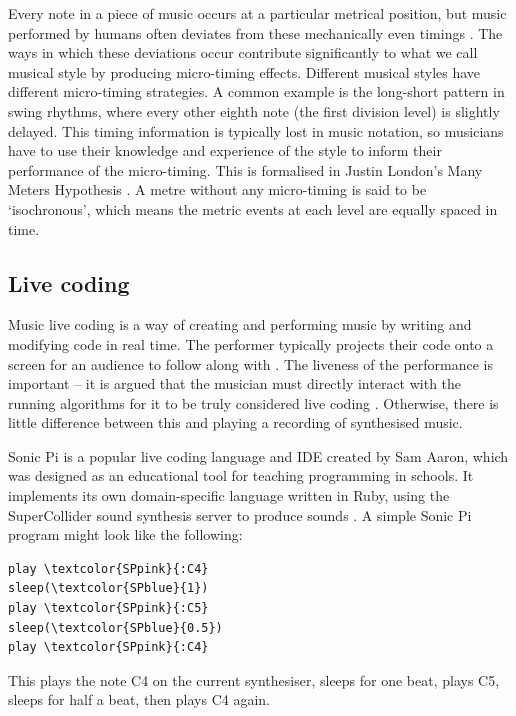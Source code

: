 \documentclass[12pt,twoside,openright]{report}
\begin{document}
Every note in a piece of music occurs at a particular metrical position, but
music performed by humans often deviates from these mechanically even timings
\cite{london2012}. The ways in which these deviations occur contribute significantly
to what we call musical style by producing micro-timing effects. Different
musical styles have different micro-timing strategies. A common example is the
long-short pattern in swing rhythms, where every other eighth note (the first
division level) is slightly delayed. This timing information is typically lost
in music notation, so musicians have to use
their knowledge and experience of the style to inform their performance of the
micro-timing. This is formalised in Justin London's Many Meters Hypothesis
\cite{london2012}. A metre without any micro-timing is said to be `isochronous',
which means the metric events at each level are equally spaced in time.


\subsection{Live coding} \label{live_coding_background}

Music live coding is a way of creating and performing music by writing and
modifying code in real time. The performer typically projects their code onto a
screen for an audience to follow along with \cite{magnusson2011}. The liveness of the
performance is important -- it is argued that the musician must directly
interact with the running algorithms for it to be truly considered live coding
\cite{collins2011}. Otherwise, there is little difference between this and playing a
recording of synthesised music.

Sonic Pi is a popular live coding language and IDE created by Sam Aaron, which
was designed as an educational tool for teaching programming in schools. It
implements its own domain-specific language written in Ruby, using the
SuperCollider sound synthesis server to produce sounds \cite{aaron2013}. A simple
Sonic Pi program might look like the following:

\begin{BVerbatim}[commandchars=\\\{\}]
play \textcolor{SPpink}{:C4}
sleep(\textcolor{SPblue}{1})
play \textcolor{SPpink}{:C5}
sleep(\textcolor{SPblue}{0.5})
play \textcolor{SPpink}{:C4}
\end{BVerbatim}

This plays the note C4 on the current synthesiser, sleeps for one beat, plays C5,
sleeps for half a beat, then plays C4 again.
\end{document}
